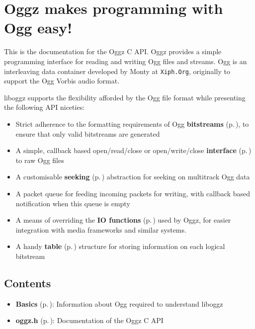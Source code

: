 \section{Oggz makes programming with Ogg easy!}\label{intro}
This is the documentation for the Oggz C API. Oggz provides a simple programming interface for reading and writing Ogg files and streams. Ogg is an interleaving data container developed by Monty at {\tt Xiph.Org}, originally to support the Ogg Vorbis audio format.

liboggz supports the flexibility afforded by the Ogg file format while presenting the following API niceties:

\begin{itemize}
\item Strict adherence to the formatting requirements of Ogg {\bf bitstreams }{\rm (p.\,\pageref{group__basics})}, to ensure that only valid bitstreams are generated\item A simple, callback based open/read/close or open/write/close {\bf interface }{\rm (p.\,\pageref{oggz_8h})} to raw Ogg files\item A customisable {\bf seeking }{\rm (p.\,\pageref{group__seek__api})} abstraction for seeking on multitrack Ogg data\item A packet queue for feeding incoming packets for writing, with callback based notification when this queue is empty\item A means of overriding the {\bf IO functions }{\rm (p.\,\pageref{oggz__io_8h})} used by Oggz, for easier integration with media frameworks and similar systems.\item A handy {\bf table }{\rm (p.\,\pageref{oggz__table_8h})} structure for storing information on each logical bitstream\end{itemize}
\subsection{Contents}\label{contents}
\begin{itemize}
\item {\bf Basics }{\rm (p.\,\pageref{group__basics})}: Information about Ogg required to understand liboggz\end{itemize}


\begin{itemize}
\item {\bf oggz.h }{\rm (p.\,\pageref{oggz_8h})}: Documentation of the Oggz C API\end{itemize}


